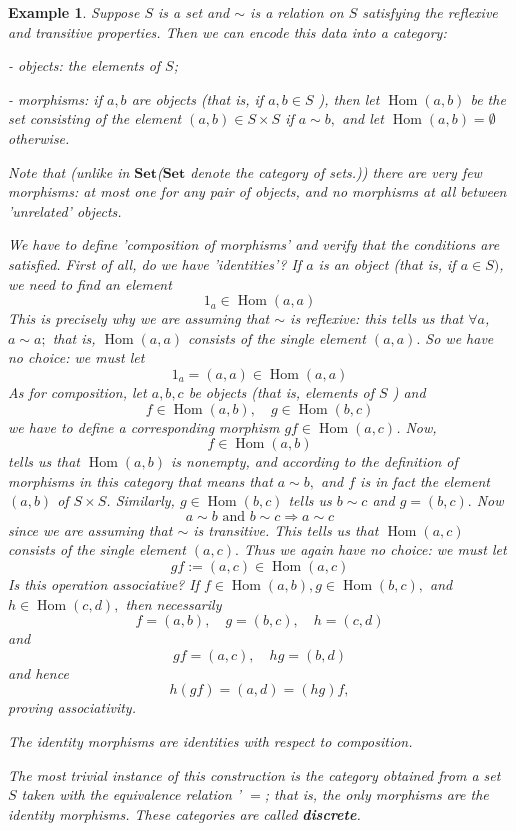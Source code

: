 \documentclass[12pt]{book}
\theoremstyle{definition}\newtheorem{dfn}{Définition}[chapter]
\theoremstyle{plain}\newtheorem{thm}{Théorème}[chapter]
\theoremstyle{plain}\newtheorem{prp}{Proposition}[chapter]
\theoremstyle{plain}\newtheorem{lem}{\bf Lemme}[chapter]
\theoremstyle{plain}\newtheorem{axm}{\bf Axiome}[chapter]
\theoremstyle{plain}\newtheorem{lmm}{\bf Lemme}[chapter]
\theoremstyle{plain}\newtheorem{exm}{\bf Example}[chapter]
\theoremstyle{plain}\newtheorem{cor}{\bf Corollaire}[chapter]
\theoremstyle{remark}\newtheorem{rem}{Remarque}[chapter]
\begin{document}
\begin{exm}
Suppose $S$ is a set and $\sim$ is a relation on $S$ satisfying the reflexive and transitive properties. Then we can encode this data into a category:

- objects: the elements of $S$;

- morphisms: if $a, b$ are objects (that is, if $a, b \in S$ ), then let $\operatorname{Hom}(a, b)$ be the set consisting of the element $(a, b) \in S \times S$ if $a \sim b,$ and let $\operatorname{Hom}(a, b)=\emptyset$ otherwise.

Note that (unlike in $\textbf {Set}$($\textbf{Set}$ denote the category of sets.)) there are very few morphisms: at most one for any pair of objects, and no morphisms at all between 'unrelated' objects.

We have to define 'composition of morphisms' and verify that the conditions are satisfied. First of all, do we have 'identities'? If $a$ is an object (that is, if $a \in S)$, we need to find an element
$$
1_{a} \in \operatorname{Hom}(a, a)
$$
This is precisely why we are assuming that $\sim$ is reflexive: this tells us that $\forall a$, $a \sim a ;$ that is, $\operatorname{Hom}(a, a)$ consists of the single element $(a, a) .$ So we have no choice:
we must let
$$
1_{a}=(a, a) \in \operatorname{Hom}(a, a)
$$
As for composition, let $a, b, c$ be objects (that is, elements of $S$ ) and
$$
f \in \operatorname{Hom}(a, b), \quad g \in \operatorname{Hom}(b, c)
$$
we have to define a corresponding morphism $g f \in \operatorname{Hom}(a, c)$. Now,
$$
f \in \operatorname{Hom}(a, b)
$$
tells us that $\operatorname{Hom}(a, b)$ is nonempty, and according to the definition of morphisms in this category that means that $a \sim b,$ and $f$ is in fact the element $(a, b)$ of $S \times S$. Similarly, $g \in \operatorname{Hom}(b, c)$ tells us $b \sim c$ and $g=(b, c) .$ Now
$$
a \sim b \text { and } b \sim c \Longrightarrow a \sim c
$$
since we are assuming that $\sim$ is transitive. This tells us that $\operatorname{Hom}(a, c)$ consists of the single element $(a, c) .$ Thus we again have no choice: we must let
$$
g f:=(a, c) \in \operatorname{Hom}(a, c)
$$
Is this operation associative? If $f \in \operatorname{Hom}(a, b), g \in \operatorname{Hom}(b, c),$ and $h \in \operatorname{Hom}(c, d),$
then necessarily $$
f=(a, b), \quad g=(b, c), \quad h=(c, d)
$$
and
$$
g f=(a, c), \quad h g=(b, d)
$$
and hence
$$
h(g f)=(a, d)=(h g) f,
$$
proving associativity.

The identity morphisms are identities with respect to composition.

The most trivial instance of this construction is the category obtained from a set $S$ taken with the equivalence relation ' $=$; that is, the only morphisms are the identity morphisms. These categories are called {\bf discrete}.
\end{exm}
\end{document}
